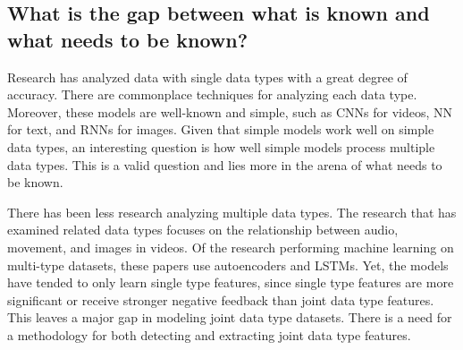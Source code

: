 \subsection{What is the gap between what is known and what needs to be known?}


Research has analyzed data with single data types with a great degree of accuracy. There are commonplace techniques for analyzing each data type.  Moreover, these models are well-known and simple, such as CNNs for videos, NN for text, and RNNs for images. Given that simple models work well on simple data types, an interesting question is how well simple models process multiple data types.  This is a valid question and lies more in the arena of what needs to be known.

There has been less research analyzing multiple data types.  The research that has examined related data types focuses on the relationship between audio, movement, and images in videos. Of the research performing machine learning on multi-type datasets, these papers use autoencoders and LSTMs.  Yet, the models have tended to only learn single type features, since single type features are more significant or receive stronger negative feedback than joint data type features.  This leaves a major gap in modeling joint data type datasets.  There is a need for a methodology for both detecting and extracting joint data type features.







